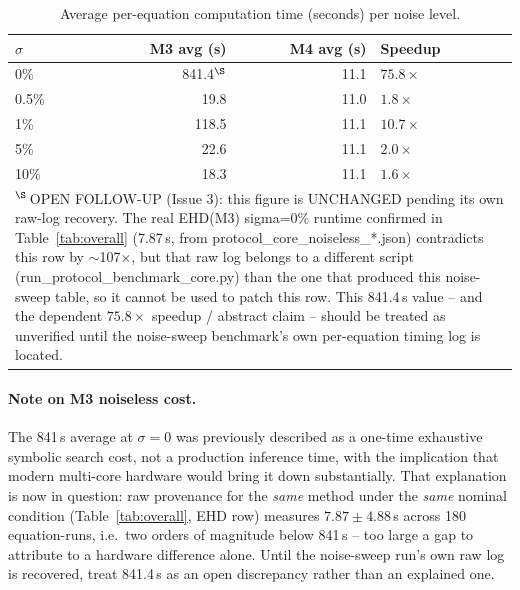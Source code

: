 \begin{table}[H]
\centering
\caption{Average per-equation computation time (seconds) per noise level.}
\label{tab:time_noise}
\small
\begin{tabular}{lrrl}
\toprule
$\sigma$ & \textcolor{m3blue}{M3 avg (s)} & \textcolor{m4red}{M4 avg (s)} & Speedup\\
\midrule
0\%   & 841.4$^{\S}$ & 11.1 & $\mathbf{75.8\times}$\\
0.5\% &  19.8 & 11.0 & $1.8\times$\\
1\%   & 118.5 & 11.1 & $\mathbf{10.7\times}$\\
5\%   &  22.6 & 11.1 & $2.0\times$\\
10\%  &  18.3 & 11.1 & $1.6\times$\\
\bottomrule
\multicolumn{4}{l}{\footnotesize $^\S$\,OPEN FOLLOW-UP (Issue 3): this figure is
  UNCHANGED pending its own raw-log recovery. The real EHD(M3) sigma=0\%
  runtime confirmed in Table~\ref{tab:overall} (7.87\,s, from
  protocol\_core\_noiseless\_*.json) contradicts this row by
  $\sim$107$\times$, but that raw log belongs to a different script
  (run\_protocol\_benchmark\_core.py) than the one that produced this
  noise-sweep table, so it cannot be used to patch this row. This 841.4\,s
  value -- and the dependent $75.8\times$ speedup / abstract claim -- should
  be treated as unverified until the noise-sweep benchmark's own
  per-equation timing log is located.}\\
\end{tabular}
\end{table}

\paragraph{Note on M3 noiseless cost.}
The 841\,s average at $\sigma=0$ was previously described as a one-time
exhaustive symbolic search cost, not a production inference time, with the
implication that modern multi-core hardware would bring it down substantially.
That explanation is now in question: raw provenance for the \emph{same}
method under the \emph{same} nominal condition (Table~\ref{tab:overall}, EHD
row) measures $7.87\pm4.88$\,s across 180 equation-runs, i.e.\ two orders of
magnitude below 841\,s -- too large a gap to attribute to a hardware
difference alone. Until the noise-sweep run's own raw log is recovered, treat
841.4\,s as an open discrepancy rather than an explained one.
